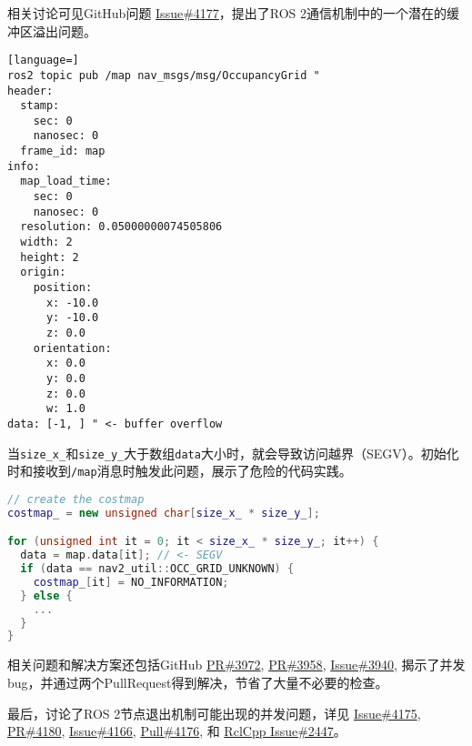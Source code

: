 相关讨论可见GitHub问题 \href{https://github.com/ros-planning/navigation2/issues/4177}{Issue\#4177}，提出了ROS 2通信机制中的一个潜在的缓冲区溢出问题。

\begin{lstlisting}[language=]
ros2 topic pub /map nav_msgs/msg/OccupancyGrid "
header:
  stamp:
    sec: 0
    nanosec: 0
  frame_id: map
info:
  map_load_time:
    sec: 0
    nanosec: 0
  resolution: 0.05000000074505806
  width: 2
  height: 2
  origin:
    position:
      x: -10.0
      y: -10.0
      z: 0.0
    orientation:
      x: 0.0
      y: 0.0
      z: 0.0
      w: 1.0
data: [-1, ] " <- buffer overflow
\end{lstlisting}

当\texttt{size\_x\_}和\texttt{size\_y\_}大于数组\texttt{data}大小时，就会导致访问越界（SEGV）。初始化时和接收到\texttt{/map}消息时触发此问题，展示了危险的代码实践。

\begin{lstlisting}[language=cpp]
// create the costmap
costmap_ = new unsigned char[size_x_ * size_y_];

for (unsigned int it = 0; it < size_x_ * size_y_; it++) {
  data = map.data[it]; // <- SEGV
  if (data == nav2_util::OCC_GRID_UNKNOWN) {
    costmap_[it] = NO_INFORMATION;
  } else {
    ...
  }
}
\end{lstlisting}

相关问题和解决方案还包括GitHub \href{https://github.com/ros-planning/navigation2/pull/3958}{PR\#3972}, \href{https://github.com/ros-planning/navigation2/pull/3958}{PR\#3958}, \href{https://github.com/ros-planning/navigation2/issues/3940}{Issue\#3940}, 揭示了并发bug，并通过两个PullRequest得到解决，节省了大量不必要的检查。

最后，讨论了ROS 2节点退出机制可能出现的并发问题，详见 \href{https://github.com/ros-planning/navigation2/issues/4175}{Issue\#4175}, \href{https://github.com/ros-planning/navigation2/pull/4180}{PR\#4180}, \href{https://github.com/ros-planning/navigation2/issues/4166}{Issue\#4166}, \href{https://github.com/ros-planning/navigation2/pull/4176}{Pull\#4176}, 和 \href{https://github.com/ros2/rclcpp/issues/2447}{RclCpp Issue\#2447}。
